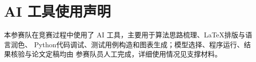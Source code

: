 \documentclass[UTF8,a4paper,zihao=5]{ctexart}
\begin{document}
\section*{AI 工具使用声明}
本参赛队在竞赛过程中使用了 AI 工具，主要用于算法思路梳理、LaTeX排版与语言润色、
Python代码调试、测试用例构造和图表生成；模型选择、程序运行、结果核验与论文定稿均由
参赛队员人工完成，详细使用情况见支撑材料。





\label{body-end}
\clearpage
\appendix
\end{document}
